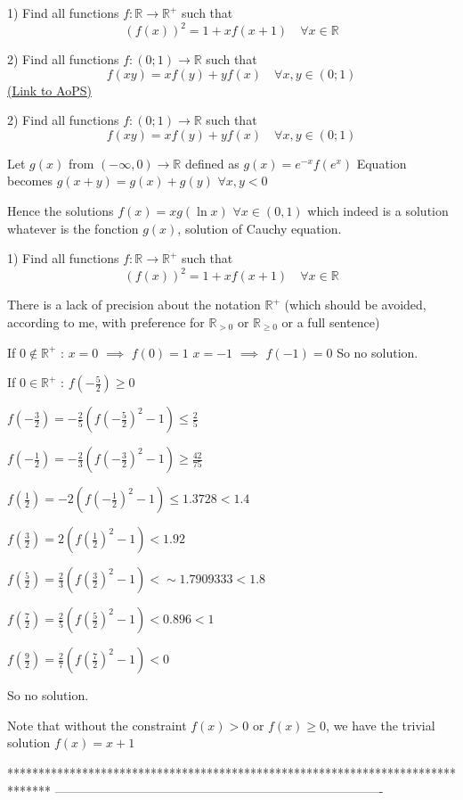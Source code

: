 \begin{problem}
	1) Find all functions $f:\mathbb{R}\to\mathbb{R}^+$ such that
\[(f(x))^2=1+xf(x+1) \quad \forall x\in\mathbb{R}\]

2) Find all functions $f:(0;1)\to\mathbb{R}$ such that
\[f(xy)=xf(y)+yf(x) \quad \forall x,y\in (0;1)\]
	\flushright \href{https://artofproblemsolving.com/community/c6h562846}{(Link to AoPS)}
\end{problem}



\begin{solution}
	\begin{tcolorbox}2) Find all functions $f:(0;1)\to\mathbb{R}$ such that
\[f(xy)=xf(y)+yf(x) \quad \forall x,y\in (0;1)\]\end{tcolorbox}
Let $g(x)$ from $(-\infty,0)\to\mathbb R$ defined as $g(x)=e^{-x}f(e^x)$
Equation becomes $g(x+y)=g(x)+g(y)$ $\forall x,y<0$

Hence the solutions $\boxed{f(x)=x g(\ln x)}$ $\forall x\in(0,1)$ which indeed is a solution whatever is the fonction $g(x)$, solution of Cauchy equation.
\end{solution}



\begin{solution}
	\begin{tcolorbox}1) Find all functions $f:\mathbb{R}\to\mathbb{R}^+$ such that
\[(f(x))^2=1+xf(x+1) \quad \forall x\in\mathbb{R}\]\end{tcolorbox}
There is a lack of precision about the notation $\mathbb R^+$ (which should be avoided, according to me,  with preference for $\mathbb R_{>0}$ or $\mathbb R_{\ge 0}$ or a full sentence)

If $0\notin\mathbb R^+$ :
$x=0$ $\implies$ $f(0)=1$
$x=-1$ $\implies$ $f(-1)=0$
So no solution.


If $0\in\mathbb R^+$ :
$f(-\frac 52)\ge 0$

$f(-\frac 32)=-\frac 25(f(-\frac 52)^2-1)\le \frac 25$

$f(-\frac 12)=-\frac 23(f(-\frac 32)^2-1)\ge \frac{42}{75}$

$f(\frac 12)=-2(f(-\frac 12)^2-1)\le  1.3728<1.4$

$f(\frac 32)=2(f(\frac 12)^2-1)< 1.92$

$f(\frac 52)=\frac 23(f(\frac 32)^2-1)< \sim 1.7909333 < 1.8$

$f(\frac 72)=\frac 25(f(\frac 52)^2-1)< 0.896< 1$

$f(\frac 92)=\frac 27(f(\frac 72)^2-1)<0$

So no solution.

Note that without the constraint $f(x)>0$ or $f(x)\ge 0$, we have the trivial solution $f(x)=x+1$
\end{solution}
*******************************************************************************
-------------------------------------------------------------------------------


